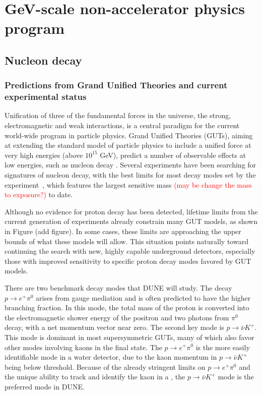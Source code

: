 \chapter{GeV-scale non-accelerator physics program}
\label{ch:nonaccel}


\section{Nucleon decay}
\label{sec:nonaccel-ndk}

\subsection{Predictions from Grand Unified Theories and current experimental status}
\label{subsec:nonaccel-ndk-status}

Unification of three of the fundamental forces in the universe, the strong, 
electromagnetic and weak interactions, is a central paradigm for the current 
world-wide program in particle physics. Grand Unified Theories (GUTs), aiming 
at extending the standard model of particle physics to include a unified force 
at very high energies  (above $10^{15}$ GeV), predict a number of observable 
effects at low energies, such as nucleon  decay \cite{Pati:1973rp,Georgi:1974sy,Dimopoulos:1981dw,Langacker:1980js,deBoer:1994dg,Nath:2006ut}. Several experiments have been searching for signatures of nucleon decay, with the best limits for most decay modes set by the \superk experiment~\cite{Miura:2016krn,Abe:2014mwa,TheSuper-Kamiokande:2017tit}, 
which features the largest sensitive mass \textcolor{red}{(may be change the mass to exposure?)} to date. 

Although no evidence for proton decay has been detected, lifetime limits from the current generation of experiments already constrain many GUT models, as shown in Figure (add figure). In some cases, these limits are approaching the upper bounds of what these models will allow. This situation points naturally toward continuing the search with new, highly capable underground detectors, especially those with improved sensitivity to specific proton decay modes favored by GUT models.

There are two benchmark decay modes that DUNE will study.  The decay $p \rightarrow e^{+}\pi^0$ arises from gauge mediation and is often predicted to have the higher branching fraction. In this mode, the total mass of the proton is converted into the electromagnetic shower energy of the positron and two photons from $\pi^0$ decay, with a net momentum vector near zero. 
The second key mode is $p \rightarrow \bar{\nu}K^{+}$. This mode is dominant in most supersymmetric GUTs, many of which also favor other modes involving kaons in the final state.  The $p \rightarrow e^{+}\pi^0$ is the more easily identifiable mode in a water \cherenkov detector, due to the kaon momentum in $p \rightarrow \bar{\nu}K^{+}$ being below \cherenkov threshold.  Because of the already stringent limits on $p \rightarrow e^{+}\pi^0$ and the unique ability to track and identify the kaon in a \lartpc, the $p \rightarrow \bar{\nu}K^{+}$ mode is the preferred mode in DUNE.

